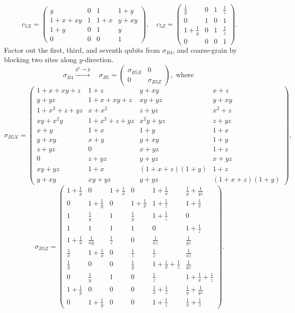 \[
 c_{5X} = 
\left(\begin{array}{cccc}
 y & 0 & 1 & 1+y \\
 1+x+x y & 1 & 1+x & y+x y \\
 1+y & 0 & 1 & y \\
 0 & 0 & 0 & 1
\end{array}\right),
\quad
c_{5Z} =
\left(\begin{array}{cccc}
 \frac{1}{y} & 0 & 1 & \frac{1}{z} \\
 0 & 1 & 0 & 1 \\
 1+\frac{1}{y} & 0 & 1 & \frac{1}{z} \\
 0 & 0 & 0 & 1
\end{array}\right).
\]
Factor out the first, third, and seventh qubits from $\sigma_{B4}$,
and coarse-grain by blocking two sites along $y$-direction.
\[
\sigma_{B4} \xrightarrow{y^2 \to y} \quad 
\sigma_{B5} = \begin{pmatrix} \sigma_{B5X} & 0 \\ 0 & \sigma_{B5Z} \end{pmatrix}, \text{ where }
\]
\[
\sigma_{B5X} =
\left(\begin{array}{cccc}
 1+x+x y+z & 1+z & y+x y & x+z \\
 y+y z & 1+x+x y+z & x y+y z & y+x y \\
 1+x^2+z+y z & x+x^2 & z+y z & x^2+z \\
 x y+x^2 y & 1+x^2+z+y z & x^2 y+y z & z+y z \\
 x+y & 1+x & 1+y & 1+x \\
 y+x y & x+y & y+x y & 1+y \\
 z+y z & 0 & x+y z & 1+z \\
 0 & z+y z & y+y z & x+y z \\
 x y+y z & 1+x & (1+x+z)(1+y) & 1+z \\
 y+x y & x y+y z & y+y z & (1+x+z)(1+y)
\end{array}\right),
\]
\[
\sigma_{B5Z} =
\left(\begin{array}{cccccc}
 1+\frac{1}{y} & 0 & 1+\frac{1}{x} & 0 & 1+\frac{1}{x} & \frac{1}{y}+\frac{1}{y z} \\
 0 & 1+\frac{1}{y} & 0 & 1+\frac{1}{x} & 1+\frac{1}{z} & 1+\frac{1}{x} \\
 1 & \frac{1}{y} & 1 & \frac{1}{y} & 1+\frac{1}{z} & 0 \\
 1 & 1 & 1 & 1 & 0 & 1+\frac{1}{z} \\
 1+\frac{1}{x} & \frac{1}{x y} & \frac{1}{z} & 0 & \frac{1}{x z} & \frac{1}{y z} \\
 \frac{1}{x} & 1+\frac{1}{x} & 0 & \frac{1}{z} & \frac{1}{z} & \frac{1}{x z} \\
 \frac{1}{y} & 0 & 0 & \frac{1}{y} & 1+\frac{1}{x}+\frac{1}{z} & \frac{1}{y z} \\
 0 & \frac{1}{y} & 1 & 0 & \frac{1}{z} & 1+\frac{1}{x}+\frac{1}{z} \\
 1+\frac{1}{y} & 0 & 0 & 0 & \frac{1}{x}+\frac{1}{z} & \frac{1}{y}+\frac{1}{y z} \\
 0 & 1+\frac{1}{y} & 0 & 0 & 1+\frac{1}{z} & \frac{1}{x}+\frac{1}{z}
\end{array}\right).
\]
